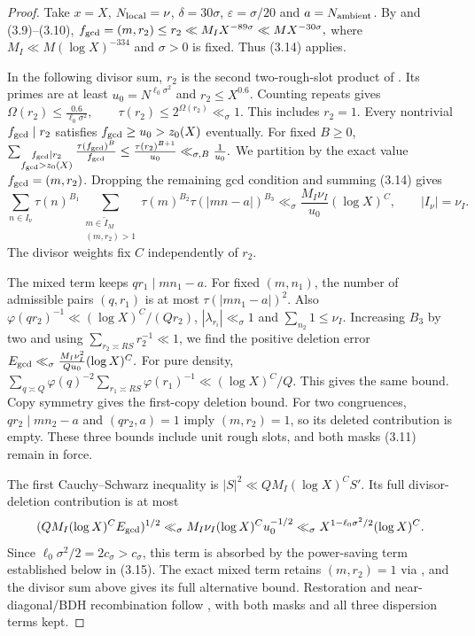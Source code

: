 \begin{proof}
Take $x=X$, $N_{\rm local}=\nu$, $\delta=30\sigma$,
$\varepsilon=\sigma/20$ and $a=N_{\rm ambient}$.
By \cite[(3.6)]{Z1} and (3.9)--(3.10),
$f_{\rm gcd}=(m,r_2)\le r_2\ll M_I X^{-89\sigma}\ll M X^{-30\sigma},$
where $M_I\ll M(\log X)^{-334}$ and $\sigma>0$ is fixed.
Thus (3.14) applies.

In the following divisor sum, $r_2$ is the second two-rough-slot product
of \cite[(3.28)--(3.31)]{Z1}.
Its primes are at least $u_0=N^{\ell_0\sigma^2}$ and $r_2\le X^{0.6}$.
Counting repeats gives
$\Omega(r_2)\le\frac{0.6}{\ell_0\sigma^2},\qquad
 \tau(r_2)\le2^{\Omega(r_2)}\ll_\sigma 1.$
This includes $r_2=1$.
Every nontrivial $f_{\rm gcd}\mid r_2$ satisfies
$f_{\rm gcd}\ge u_0>z_0(X)$ eventually.
For fixed $B\ge0$,
$\sum_{\substack{f_{\rm gcd}\mid r_2\\f_{\rm gcd}>z_0(X)}}\frac{\tau(f_{\rm gcd})^B}{f_{\rm gcd}}
 \le\frac{\tau(r_2)^{B+1}}{u_0}\ll_{\sigma,B}\frac1{u_0}.$
We partition by the exact value $f_{\rm gcd}=(m,r_2)$.
Dropping the remaining gcd condition and summing (3.14) gives
\[
 \sum_{n\in I_\nu}\tau(n)^{B_1}
 \sum_{\substack{m\in\widetilde I_M\\(m,r_2)>1}}
 \tau(m)^{B_2}\tau(|mn-a|)^{B_3}
 \ll_\sigma\frac{M_I\nu_I}{u_0}(\log X)^C,\qquad |I_\nu|=\nu_I.
\]
The divisor weights fix $C$ independently of $r_2$.

The mixed term keeps $qr_1\mid mn_1-a$.
For fixed $(m,n_1)$, the number of admissible pairs $(q,r_1)$ is at most
$\tau(|mn_1-a|)^2$.
Also $\varphi(qr_2)^{-1}\ll(\log X)^C/(Qr_2)$,
$|\lambda_{r_i}|\ll_\sigma1$ and $\sum_{n_2}1\le\nu_I$.
Increasing $B_3$ by two and using $\sum_{r_2\asymp RS}r_2^{-1}\ll1$, we find the positive deletion error
$E_{\rm gcd}\ll_\sigma\frac{M_I\nu_I^2}{Q u_0}(\log X)^C.$
For pure density,
$\sum_{q\asymp Q}\varphi(q)^{-2}\sum_{r_1\asymp RS}\varphi(r_1)^{-1}
\ll(\log X)^C/Q$.
This gives the same bound.
Copy symmetry gives the first-copy deletion bound.
For two congruences, $qr_2\mid mn_2-a$ and $(qr_2,a)=1$
imply $(m,r_2)=1$, so its deleted contribution is empty.
These three bounds include unit rough slots, and both masks (3.11) remain in force.

The first Cauchy--Schwarz inequality is
$|S|^2\ll QM_I(\log X)^C S'$.
Its full divisor-deletion contribution is at most
\[
 (QM_I(\log X)^CE_{\rm gcd})^{1/2}
 \ll_\sigma M_I\nu_I(\log X)^C u_0^{-1/2}
 \ll_\sigma X^{1-\ell_0\sigma^2/2}(\log X)^C.
\]
Since $\ell_0\sigma^2/2=2c_\sigma>c_\sigma$, this term is absorbed by
the power-saving term established below in (3.15).
The exact mixed term retains $(m,r_2)=1$ via \cite[\S3.5, (3.45)]{Z1},
and the divisor sum above gives its full alternative bound.
Restoration and near-diagonal/BDH recombination follow
\cite[(3.34)--(3.47), (3.49)--(3.53)]{Z1}, with both masks and all three dispersion terms kept.


\end{proof}
